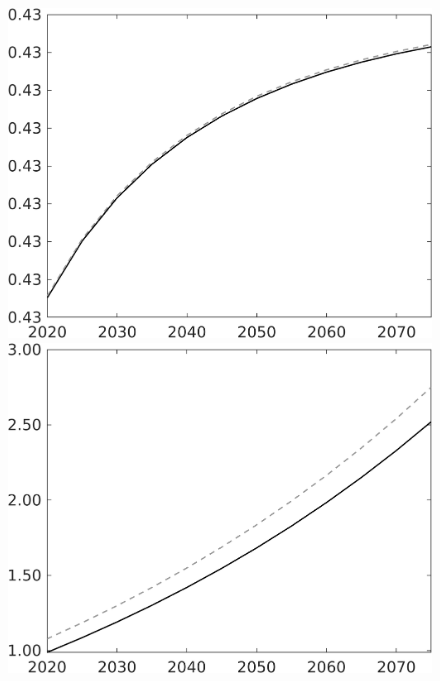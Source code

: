 \documentclass[12pt]{article}
\begin{document}
\begin{figure}[h!!]
\begin{minipage}[]{0.32\textwidth}
	\end{minipage}
	\begin{minipage}[]{0.32\textwidth}
		\includegraphics[width=1\textwidth]{../../codding_model/own_basedOnFried/optimalPol_010922_revision/figures/all_13Sept22/CompTaul_Equlab_LFBAU_Reg0_EY_spillover0_nsk0_xgr0_knspil0_sep1_countec0_GovRev0_etaa0.79_lgd0.png}
	\end{minipage}	
	\begin{minipage}[]{0.32\textwidth}
		\includegraphics[width=1\textwidth]{../../codding_model/own_basedOnFried/optimalPol_010922_revision/figures/all_13Sept22/CompTaul_Equlab_LFBAU_Reg0_N_spillover0_nsk0_xgr0_knspil0_sep1_countec0_GovRev0_etaa0.79_lgd0.png}
	\end{minipage}		
\end{figure}
\end{document}
